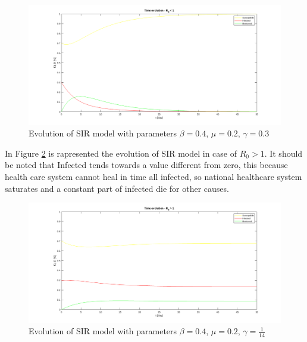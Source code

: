 \begin{figure}[h!]
    \centering
    \includegraphics[width=\linewidth]{Figure/SIR_evolution_r0_minor_1.png}
    \caption{Evolution of SIR model with parameters $\beta = 0.4$, $\mu = 0.2$, $\gamma = 0.3$}
    \label{fig:sir_model_evolution_r0_minor_1}
\end{figure}

In Figure \ref{fig:sir_model_evolution_r0_major_1} is rapresented the evolution of SIR model in case of $R_0 > 1$. It should be noted that Infected tends towards a value different from zero, this because health care system cannot heal in time all infected, so national healthcare system saturates and a constant part of infected die for other causes.

\begin{figure}[h!]
    \centering
    \includegraphics[width=\linewidth]{Figure/SIR_evolution_r0_major_1.png}
    \caption{Evolution of SIR model with parameters $\beta = 0.4$, $\mu = 0.2$, $\gamma = \frac{1}{14}$}
    \label{fig:sir_model_evolution_r0_major_1}
\end{figure}